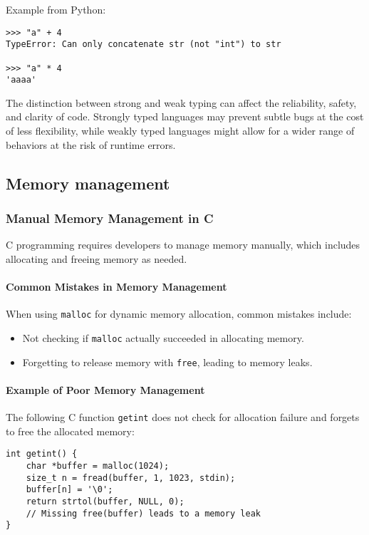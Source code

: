 \documentclass[12pt]{article}
\begin{document}
Example from Python:
\begin{lstlisting}
>>> "a" + 4
TypeError: Can only concatenate str (not "int") to str

>>> "a" * 4
'aaaa'
\end{lstlisting}


The distinction between strong and weak typing can affect the reliability, safety, and clarity of code. Strongly typed languages may prevent subtle bugs at the cost of less flexibility, while weakly typed languages might allow for a wider range of behaviors at the risk of runtime errors.




\subsection{Memory management}
\subsubsection{Manual Memory Management in C}

C programming requires developers to manage memory manually, which includes allocating and freeing memory as needed.

\paragraph{Common Mistakes in Memory Management}

When using \texttt{malloc} for dynamic memory allocation, common mistakes include:

\begin{itemize}
    \item Not checking if \texttt{malloc} actually succeeded in allocating memory.
    \item Forgetting to release memory with \texttt{free}, leading to memory leaks.
\end{itemize}

\paragraph{Example of Poor Memory Management}
The following C function \texttt{getint} does not check for allocation failure and forgets to free the allocated memory:

\begin{lstlisting}
int getint() {
    char *buffer = malloc(1024);
    size_t n = fread(buffer, 1, 1023, stdin);
    buffer[n] = '\0';
    return strtol(buffer, NULL, 0);
    // Missing free(buffer) leads to a memory leak
}
\end{lstlisting}
\end{document}
